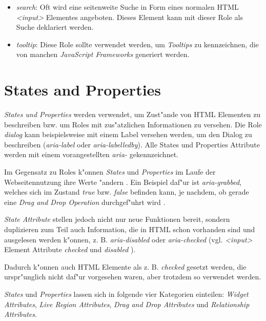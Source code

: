 \documentclass[a4paper,bibtotoc,oneside]{scrbook}
\begin{document}
\begin{itemize}
\item \emph{search}: Oft wird eine seitenweite Suche in Form eines normalen HTML \emph{<input>} Elementes angeboten. Dieses Element kann mit dieser Role als Suche deklariert werden. \cite[Abschnitt 5.4, search]{aria_roles}

\item \emph{tooltip}: Diese Role sollte verwendet werden, um \emph{Tooltips} zu kennzeichnen, die von manchen \emph{JavaScript Frameworks} generiert werden. \cite[Abschnitt 5.4, tooltip]{aria_roles}
\end{itemize}



\section{States and Properties}
\emph{States und Properties} werden verwendet, um Zust"ande von HTML Elementen zu beschreiben bzw. um Roles mit zus"atzlichen Informationen zu versehen. Die Role \emph{dialog} kann beispielsweise mit einem Label versehen werden, um den Dialog zu beschreiben (\emph{aria-label} oder \emph{aria-labelledby})\cite[Abschnitt 5.4, dialog]{aria_roles}. Alle States und Properties Attribute werden mit einem vorangestellten \emph{aria-} gekennzeichnet. \cite[Abschnitt 6.1]{aria_states}

Im Gegensatz zu Roles k"onnen \emph{States} und \emph{Properties} im Laufe der Webseitennutzung ihre Werte "andern \cite[S. 29]{mod_software}. Ein Beispiel daf"ur ist \emph{aria-grabbed}, welches sich im Zustand \emph{true} bzw. \emph{false} befinden kann, je nachdem, ob gerade eine \emph{Drag and Drop Operation} durchgef"uhrt wird \cite[Abschnitt 6.6, aria-grabbed]{aria_states}.

\emph{State Attribute} stellen jedoch nicht nur neue Funktionen bereit, sondern duplizieren zum Teil auch Information, die in HTML schon vorhanden sind und ausgelesen werden k"onnen, z. B. \emph{aria-disabled} oder \emph{aria-checked} \cite[States and Properties]{aria} (vgl. \emph{<input>} Element Attribute \emph{checked} und \emph{disabled} \cite[Abschnitt Forms, Input Element]{html4}). 

Dadurch k"onnen auch HTML Elemente als z. B. \emph{checked} gesetzt werden, die urspr"unglich nicht daf"ur vorgesehen waren, aber trotzdem so verwendet werden. 

\emph{States} und \emph{Properties} lassen sich in folgende vier Kategorien einteilen: \emph{Widget Attributes}, \emph{Live Region Attributes}, \emph{Drag and Drop Attributes} und \emph{Relationship Attributes}. \cite[Abschnitt 6.5]{aria_states}
\end{document}
